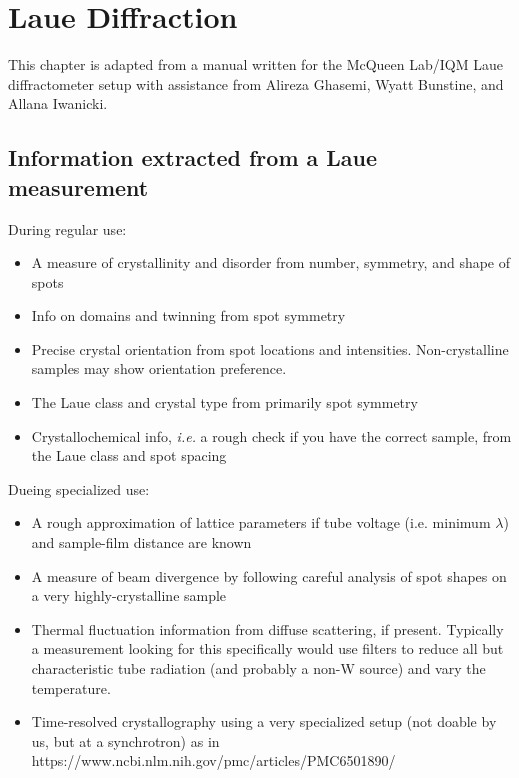 \chapter{Laue Diffraction} \label{chap:chap-1}



\begin{singlespace}         %
    This chapter is adapted from a manual written for the McQueen Lab/IQM Laue diffractometer setup with assistance from Alireza Ghasemi, Wyatt Bunstine, and Allana Iwanicki.

\end{singlespace} 

\section{Information extracted from a Laue measurement}
During regular use:
\begin{itemize}
    \item A measure of crystallinity and disorder from number, symmetry, and shape of spots
    \item Info on domains and twinning from spot symmetry
    \item Precise crystal orientation from spot locations and intensities. Non-crystalline samples may show orientation preference.
    \item The Laue class and crystal type from primarily spot symmetry 
    \item Crystallochemical info, \textit{i.e.} a rough check if you have the correct sample, from the Laue class and spot spacing
\end{itemize}
Dueing specialized use:
\begin{itemize}
    \item A rough approximation of lattice parameters if tube voltage (i.e. minimum $\lambda$) and sample-film distance are known
    \item A measure of beam divergence by following careful analysis of spot shapes on a very highly-crystalline sample 
    \item Thermal fluctuation information from diffuse scattering, if present. Typically a measurement looking for this specifically would use filters to reduce all but characteristic tube radiation (and probably a non-W source) and vary the temperature.
    \item Time-resolved crystallography using a very specialized setup (not doable by us, but at a synchrotron) as in https://www.ncbi.nlm.nih.gov/pmc/articles/PMC6501890/ 
\end{itemize}
